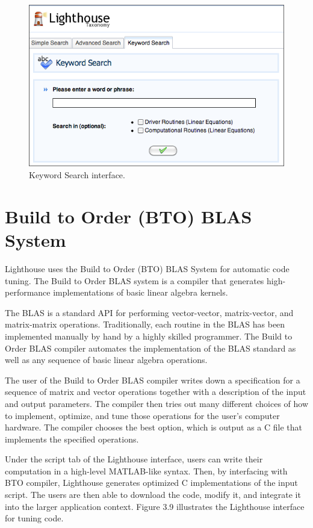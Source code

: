 \begin{figure}[h!]\label{keywordsearch1}
  \centering
  \includegraphics[width=6in]{figs/keywordsearch1}
  \caption[Keyword Search interface]
   {Keyword Search interface.}
\end{figure}

\section{Build to Order (BTO) BLAS System}

Lighthouse uses the Build to Order (BTO) \cite{bto} BLAS System for automatic code tuning. The Build to Order BLAS system is a compiler that generates high-performance implementations of basic linear algebra kernels.
 
The BLAS is a standard API for performing vector-vector, matrix-vector, and matrix-matrix operations. Traditionally, each routine in the BLAS has been implemented manually by hand by a highly skilled programmer. The Build to Order BLAS compiler automates the implementation of the BLAS standard as well as any sequence of basic linear algebra operations. 

The user of the Build to Order BLAS compiler writes down a specification for a sequence of matrix and vector operations together with a description of the input and output parameters. The compiler then tries out many different choices of how to implement, optimize, and tune those operations for the user's computer hardware. The compiler chooses the best option, which is output as a C file that implements the specified operations. 

Under the script tab of the Lighthouse interface, users can write their computation in a high-level MATLAB-like syntax. Then, by interfacing with BTO compiler, Lighthouse generates optimized C implementations of the input script. The users are then able to download the code, modify it, and integrate it into the larger application context. Figure 3.9 illustrates the Lighthouse interface for tuning code.

